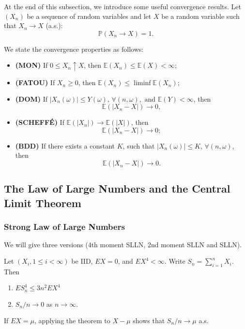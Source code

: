 At the end of this subsection, we introduce some useful convergence results. Let \( (X_n) \) be a sequence of random variables and let \( X \) be a random variable such that \( X_n \to X \) (a.s.):
\[
\mathbb{P}(X_n \to X) = 1.
\]

We state the convergence properties as follows:

\begin{itemize}
    \item \textbf{(MON)} If \( 0 \leq X_n \uparrow X \), then \( \mathbb{E}(X_n) \leq \mathbb{E}(X) < \infty \);
    \item \textbf{(FATOU)} If \( X_n \geq 0 \), then \( \mathbb{E}(X_n) \leq \liminf \mathbb{E}(X_n) \);
    \item \textbf{(DOM)} If \( |X_n(\omega)| \leq Y(\omega), \, \forall (n, \omega), \text{ and } \mathbb{E}(Y) < \infty \), then
    \[
    \mathbb{E}(|X_n - X|) \to 0,
    \]
    \item \textbf{(SCHEFFÉ)} If \( \mathbb{E}(|X_n|) \to \mathbb{E}(|X|) \), then
    \[
    \mathbb{E}(|X_n - X|) \to 0;
    \]
    \item \textbf{(BDD)} If there exists a constant \( K \), such that \( |X_n(\omega)| \leq K, \, \forall (n, \omega) \), then
    \[
    \mathbb{E}(|X_n - X|) \to 0.
    \]
\end{itemize}


\subsection{The Law of Large Numbers and the Central Limit Theorem}
\subsubsection{Strong Law of Large Numbers}
We will give three versions (4th moment SLLN, 2nd moment SLLN and SLLN).
\begin{thm}
Let $(X_i, 1 \leq i < \infty)$ be IID, $EX = 0$, and $EX^4 < \infty$. Write $S_n = \sum_{i=1}^{n} X_i$. Then
\begin{enumerate}
    \item $ES_n^4 \leq 3n^2 EX^4$
    \item $S_n/n \to 0$ as $n \to \infty$.
\end{enumerate}
\end{thm}

If $EX = \mu$, applying the theorem to $X - \mu$ shows that $S_n/n \to \mu$ a.s.

